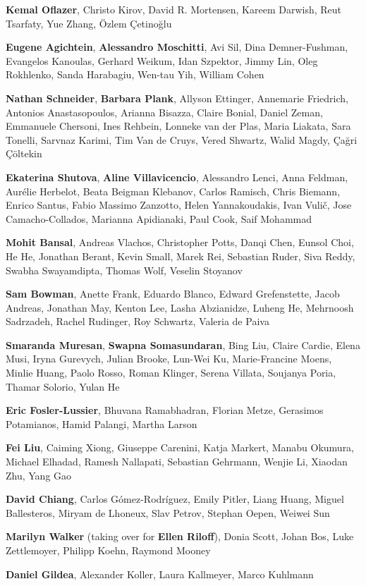 \textbf{Kemal Oflazer},
Christo Kirov, David R. Mortensen, Kareem Darwish, Reut Tsarfaty, Yue Zhang, \"{O}zlem \c{C}etino\u{g}lu

\textbf{Eugene Agichtein},
\textbf{Alessandro Moschitti},
Avi Sil, Dina Demner-Fushman, Evangelos Kanoulas, Gerhard Weikum, Idan Szpektor, Jimmy Lin, Oleg Rokhlenko, Sanda Harabagiu, Wen-tau Yih, William Cohen

\textbf{Nathan Schneider},
\textbf{Barbara Plank},
Allyson Ettinger, Annemarie Friedrich, Antonios Anastasopoulos, Arianna Bisazza, Claire Bonial, Daniel Zeman, Emmanuele Chersoni, Ines Rehbein, Lonneke van der Plas, Maria Liakata, Sara Tonelli, Sarvnaz Karimi, Tim Van de Cruys, Vered Shwartz, Walid Magdy, \c{C}a\u{g}ri \c{C}\"{o}ltekin

\textbf{Ekaterina Shutova},
\textbf{Aline Villavicencio},
Alessandro Lenci, Anna Feldman, Aur\'{e}lie Herbelot, Beata Beigman Klebanov, Carlos Ramisch, Chris Biemann, Enrico Santus, Fabio Massimo Zanzotto, Helen Yannakoudakis, Ivan Vuli\v{c}, Jose Camacho-Collados, Marianna Apidianaki, Paul Cook, Saif Mohammad

\textbf{Mohit Bansal},
Andreas Vlachos, Christopher Potts, Danqi Chen, Eunsol Choi, He He, Jonathan Berant, Kevin Small, Marek Rei, Sebastian Ruder, Siva Reddy, Swabha Swayamdipta, Thomas Wolf, Veselin Stoyanov

\textbf{Sam Bowman},
Anette Frank, Eduardo Blanco, Edward Grefenstette, Jacob Andreas, Jonathan May, Kenton Lee, Lasha Abzianidze, Luheng He, Mehrnoosh Sadrzadeh, Rachel Rudinger, Roy Schwartz, Valeria de Paiva

\textbf{Smaranda Muresan},
\textbf{Swapna Somasundaran},
Bing Liu, Claire Cardie, Elena Musi, Iryna Gurevych, Julian Brooke, Lun-Wei Ku, Marie-Francine Moens, Minlie Huang, Paolo Rosso, Roman Klinger, Serena Villata, Soujanya Poria, Thamar Solorio, Yulan He

\textbf{Eric Fosler-Lussier},
Bhuvana Ramabhadran, Florian Metze, Gerasimos Potamianos, Hamid Palangi, Martha Larson

\aclitem[Summarization]
\textbf{Fei Liu},
Caiming Xiong, Giuseppe Carenini, Katja Markert, Manabu Okumura, Michael Elhadad, Ramesh Nallapati, Sebastian Gehrmann, Wenjie Li, Xiaodan Zhu, Yang Gao

\textbf{David Chiang},
Carlos G\'{o}mez-Rodr\'{i}guez, Emily Pitler, Liang Huang, Miguel Ballesteros, Miryam de Lhoneux, Slav Petrov, Stephan Oepen, Weiwei Sun

\aclitem[Theme]
\textbf{Marilyn Walker} (taking over for \textbf{Ellen Riloff}),
Donia Scott, Johan Bos, Luke Zettlemoyer, Philipp Koehn, Raymond Mooney

\textbf{Daniel Gildea},
Alexander Koller, Laura Kallmeyer, Marco Kuhlmann

\setlength{\leftskip}{0cm}
